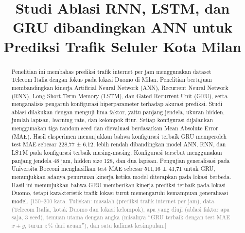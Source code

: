 \documentclass[conference,a4paper]{IEEEtran}
\newcommand{\petunjuk}[1]{\textcolor{gray}{[#1]}}
\begin{document}
\title{Studi Ablasi RNN, LSTM, dan GRU dibandingkan ANN untuk Prediksi Trafik Seluler Kota Milan}

\author{
\and
{}
\and
{}
}

\maketitle

\begin{abstract}
Penelitian ini membahas prediksi trafik internet per jam menggunakan dataset Telecom Italia dengan fokus pada lokasi Duomo di Milan. Penelitian bertujuan membandingkan kinerja Artificial Neural Network (ANN), Recurrent Neural Network (RNN), Long Short-Term Memory (LSTM), dan Gated Recurrent Unit (GRU), serta menganalisis pengaruh konfigurasi hiperparameter terhadap akurasi prediksi. Studi ablasi dilakukan dengan menguji lima faktor, yaitu panjang jendela, ukuran hidden, jumlah lapisan, learning rate, dan kelompok fitur. Setiap konfigurasi dijalankan menggunakan tiga random seed dan dievaluasi berdasarkan Mean Absolute Error (MAE). Hasil eksperimen menunjukkan bahwa konfigurasi terbaik GRU memperoleh test MAE sebesar 228,77 ± 6,12, lebih rendah dibandingkan model ANN, RNN, dan LSTM pada konfigurasi terbaik masing-masing. Konfigurasi tersebut menggunakan panjang jendela 48 jam, hidden size 128, dan dua lapisan. Pengujian generalisasi pada Universita Bocconi menghasilkan test MAE sebesar 511,16 ± 41,71 untuk GRU, menunjukkan adanya penurunan kinerja ketika model diterapkan pada lokasi berbeda. Hasil ini menunjukkan bahwa GRU memberikan kinerja prediksi terbaik pada lokasi Duomo, tetapi karakteristik trafik lokasi turut memengaruhi kemampuan generalisasi model.
\petunjuk{150--200 kata. Tuliskan: masalah (prediksi trafik internet per jam), data (Telecom Italia, kotak Duomo dan lokasi kelompok), apa yang diuji (ablasi faktor apa saja, 3 seed), temuan utama dengan angka (misalnya ``GRU terbaik dengan test MAE $x \pm y$, turun $z$\,\% dari acuan''), dan satu kalimat kesimpulan.}
\end{abstract}
\end{document}
